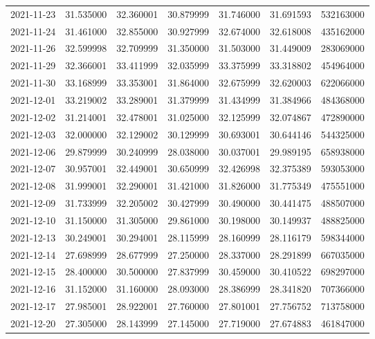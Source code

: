 \begin{tabular}{lrrrrrr}
2021-11-23 &   31.535000 &   32.360001 &   30.879999 &   31.746000 &   31.691593 &   532163000 \\
2021-11-24 &   31.461000 &   32.855000 &   30.927999 &   32.674000 &   32.618008 &   435162000 \\
2021-11-26 &   32.599998 &   32.709999 &   31.350000 &   31.503000 &   31.449009 &   283069000 \\
2021-11-29 &   32.366001 &   33.411999 &   32.035999 &   33.375999 &   33.318802 &   454964000 \\
2021-11-30 &   33.168999 &   33.353001 &   31.864000 &   32.675999 &   32.620003 &   622066000 \\
2021-12-01 &   33.219002 &   33.289001 &   31.379999 &   31.434999 &   31.384966 &   484368000 \\
2021-12-02 &   31.214001 &   32.478001 &   31.025000 &   32.125999 &   32.074867 &   472890000 \\
2021-12-03 &   32.000000 &   32.129002 &   30.129999 &   30.693001 &   30.644146 &   544325000 \\
2021-12-06 &   29.879999 &   30.240999 &   28.038000 &   30.037001 &   29.989195 &   658938000 \\
2021-12-07 &   30.957001 &   32.449001 &   30.650999 &   32.426998 &   32.375389 &   593053000 \\
2021-12-08 &   31.999001 &   32.290001 &   31.421000 &   31.826000 &   31.775349 &   475551000 \\
2021-12-09 &   31.733999 &   32.205002 &   30.427999 &   30.490000 &   30.441475 &   488507000 \\
2021-12-10 &   31.150000 &   31.305000 &   29.861000 &   30.198000 &   30.149937 &   488825000 \\
2021-12-13 &   30.249001 &   30.294001 &   28.115999 &   28.160999 &   28.116179 &   598344000 \\
2021-12-14 &   27.698999 &   28.677999 &   27.250000 &   28.337000 &   28.291899 &   667035000 \\
2021-12-15 &   28.400000 &   30.500000 &   27.837999 &   30.459000 &   30.410522 &   698297000 \\
2021-12-16 &   31.152000 &   31.160000 &   28.093000 &   28.386999 &   28.341820 &   707366000 \\
2021-12-17 &   27.985001 &   28.922001 &   27.760000 &   27.801001 &   27.756752 &   713758000 \\
2021-12-20 &   27.305000 &   28.143999 &   27.145000 &   27.719000 &   27.674883 &   461847000 \\

\end{tabular}
